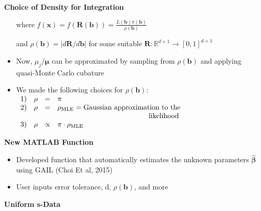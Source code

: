 \documentclass[final,mathserif]{beamer}
\newcommand{\blue}[1]{{\color{myblue}#1}}
\renewcommand{\blue}{\textcolor{blue!80!black}}
\begin{document}
\begin{frame}[fragile]
\begin{columns}[t]
\begin{column}{.31\linewidth}
\begin{block}{\Large \textbf{\blue {Choice of Density for Integration}}}
\begin{itemize}
where $f(\boldsymbol{x})=f(\boldsymbol{R}(\boldsymbol{b}))=\frac{L(\boldsymbol{b})\pi(\boldsymbol{b})}{\rho(\boldsymbol{b})}$

\vspace{.15in}

and $\rho(\boldsymbol{b})=\left|d\boldsymbol{R}/d\boldsymbol{b}\right|$ for some suitable $\boldsymbol{R}:\mathbb{R}^{d+1}\rightarrow [0,1]^{d+1}$

\vspace{.1in}

\item Now, $\mu_j/\boldsymbol{\mu}$ can be approximated by sampling from $\rho(\boldsymbol{b})$ and applying quasi-Monte Carlo cubature

\item  We made the following choices for $\rho(\boldsymbol{b})$:
$\begin{array}{rrcl}
1) & \rho & = & \pi \\
2) & \rho & = & \rho_{\text{MLE}} = \text{Gaussian approximation to the}\\ 
&&&\hspace{4.5cm} \text{likelihood}\\
3) & \rho & \propto & \pi \cdot \rho_{\text{MLE}}
\end{array}$

\end{itemize}
\end{block}

\vspace{0.1in}

\begin{block}{\Large \textbf{\blue {New MATLAB Function}}}
\vspace{.1in}
\begin{itemize}

\item Developed  \alert{function}  that \alert{automatically} estimates the unknown parameters $\hat{\boldsymbol{\beta}}$ using GAIL (Choi Et al, 2015)  

\item User inputs error tolerance, d, $\rho(\boldsymbol{b})$, and more

\end{itemize}
\end{block}

\vspace{0.1in}

\begin{block}{\Large \textbf{\blue {Uniform s-Data}}}    


\end{block}
\end{column}
\end{columns}
\end{frame}
\end{document}
